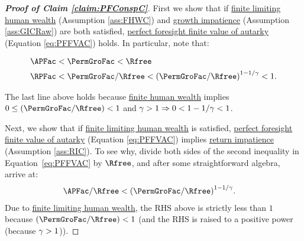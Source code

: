 \documentclass[\econtexRoot/BufferStockTheory]{subfiles}
\begin{document}
\begin{proof}[\textbf{Proof of Claim \ref{claim:PFConspC}}]
First we show that if \hyperlink{FHWC}{finite limiting human wealth} (Assumption \ref{ass:FHWC}) and \hyperlink{GICRaw}{growth impatience} (Assumption \ref{ass:GICRaw}) are both satisfied, \hyperlink{PFFVAC}{perfect foresight finite value of autarky} (Equation \eqref{eq:PFFVAC}) holds.
In particular, note that:
  
\begin{equation}\label{eq:GICandFHWCimplyPFFVAC}
  \begin{aligned}
    \APFac & < \PermGroFac < \Rfree
    \\   \RPFac & < \PermGroFac/\Rfree < {(\PermGroFac/\Rfree)}^{1-1/\CRRA} < 1.
  \end{aligned}
\end{equation}

The last line above holds because \hyperlink{FHWC}{finite human wealth} implies $0 \leq (\PermGroFac/\Rfree) < 1$ and $\gamma > 1 \Rightarrow 0 < 1-1/\gamma < 1$.


Next, we show that if \hyperlink{FHWC}{finite limiting human wealth} is satisfied, \hyperlink{PFFVAC}{perfect foresight finite value of autarky} (Equation \eqref{eq:PFFVAC}) implies \hyperlink{RIC}{return impatience} (Assumption \ref{ass:RIC}).
To see why, divide both sides of the second inequality in Equation~\eqref{eq:PFFVAC} by $\Rfree$, and after some straightforward algebra, arrive at:
%
  \begin{equation}\begin{gathered}\begin{aligned}
    \APFac/\Rfree & < {(\PermGroFac/\Rfree)}^{1-1/\CRRA}  \label{eq:FHWCandPFFVACimplyRIC}.
  \end{aligned}\end{gathered}\end{equation}
  Due to \hyperlink{FHWC}{finite limiting human wealth}, the RHS above is strictly less than $ 1$ because $(\PermGroFac/\Rfree) < 1$ (and the RHS is raised to a positive power (because $\gamma>1$)).

\end{proof}
%

\end{document}
